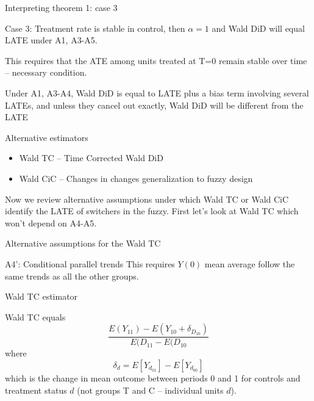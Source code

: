 \documentclass{beamer}
\begin{document}
\begin{frame}{Interpreting theorem 1: case 3}

Case 3: Treatment rate is stable in control, then $\alpha=1$ and Wald DiD will equal LATE under A1, A3-A5. \\

\bigskip

This requires that the ATE among units treated at T=0 remain stable over time -- necessary condition. \\

\bigskip

Under A1, A3-A4, Wald DiD is equal to LATE plus a bias term involving several LATEs, and unless they cancel out exactly, Wald DiD will be different from the LATE

\end{frame}

\begin{frame}{Alternative estimators}

\begin{itemize}
\item Wald TC -- Time Corrected Wald DiD
\item Wald CiC -- Changes in changes generalization to fuzzy design
\end{itemize}

Now we review alternative assumptions under which Wald TC or Wald CiC identify the LATE of switchers in the fuzzy.  First let's look at Wald TC which won't depend on A4-A5.

\end{frame}

\begin{frame}{Alternative assumptions for the Wald TC}

\begin{block}{A4': Conditional parallel trends}
This requires $Y(0)$ mean average follow the same trends as all the other groups.
\end{block}

\end{frame}

\begin{frame}{Wald TC estimator}

Wald TC equals $$\frac{
E(Y_{11}) - E(Y_{10} + \delta_{D_{10}})}{E(D_{11} - E(D_{10}}$$where $$\delta_d = E[Y_{d_{01}}] - E[Y_{d_{00}}]$$ which is the change in mean outcome between periods 0 and 1 for controls and treatment status $d$ (not groups T and C -- individual units $d$). 

\end{frame}
\end{document}
